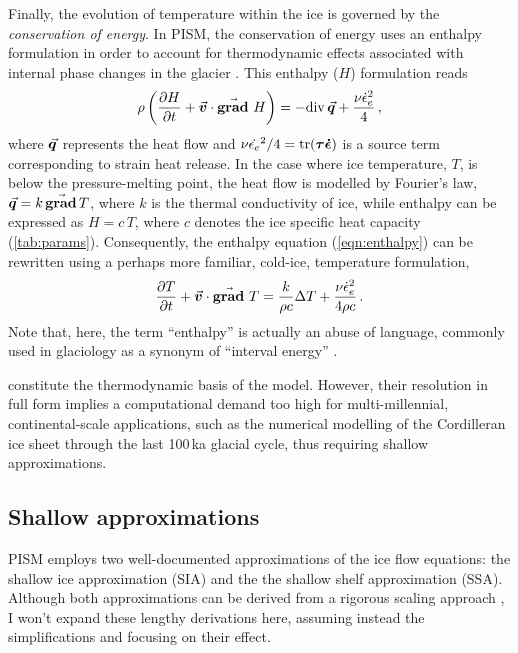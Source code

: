 \documentclass[a4paper]{kappa}
\newcommand{\vect}[1]{\va*{#1}} %
\newcommand{\tens}[1]{\vb*{#1}} %
\renewcommand{\div}[1]{\mathrm{div}\,#1}            %
\renewcommand{\grad}[1]{\vect{\mathrm{grad}}\,#1}   %
\newcommand{\matdv}[1]{\pdv{#1}{t}+\vect{v}\cdot\grad{}\,#1}  %
\newcommand{\doteps}[0]{\dot{\epsilon}} %
\newcommand{\DST}[0]{\tens{\tau}}       %
\newcommand{\SRT}[0]{\tens{\doteps}}    %
\begin{document}
Finally, the evolution of temperature within the ice is governed by the
\emph{conservation of energy}. In PISM, the conservation of energy uses an
enthalpy formulation in order to
account for thermodynamic effects associated with internal phase changes in the
glacier \citep[Eqs.~20--21]{Aschwanden.etal.2012}. This enthalpy ($H$)
formulation reads
\begin{equation}
    \label{eqn:enthalpy}
    \rho \left(\matdv{H}\right)
        = -\div{\vect{q}} + \frac{\nu\doteps_e^2}{4} \,,
\end{equation}
where $\vect{q}$ represents the heat flow and
${\nu\dot{\epsilon_e}^2/4 = \tr(\DST\SRT)}$ is a
source term corresponding to strain heat release. In the case where ice
temperature, $T$, is below the pressure-melting point, the heat flow is
modelled by Fourier's law, $\vect{q} = k\,\grad{T}$, where $k$ is the thermal
conductivity of ice, while enthalpy can be expressed as $H=c\,T$, where $c$
denotes the ice specific heat capacity (\cref{tab:params}).
Consequently, the enthalpy equation (\ref{eqn:enthalpy}) can be rewritten using
a perhaps more familiar, cold-ice, temperature formulation,
\begin{equation}
    \label{eqn:temperature}
    \matdv{T} = \frac{k}{\rho c} \Delta T
                + \frac{\nu\doteps_e^2}{4\rho c} \,.
\end{equation}
Note that, here, the term ``enthalpy'' is actually an abuse of
language, commonly used in glaciology as a synonym of ``interval energy''
\citep{Aschwanden.etal.2012}.

constitute the thermodynamic basis
of the model. However, their resolution in full form implies a computational
demand too high for multi-millennial, continental-scale applications, such as
the numerical modelling of the Cordilleran ice sheet through the last 100\,ka
glacial cycle, thus requiring shallow approximations.


\subsection{Shallow approximations}
\label{sec:siassa}

PISM employs two well-documented
approximations of the ice flow equations: the shallow ice approximation (SIA)
and the the shallow shelf approximation (SSA). Although both approximations can
be derived from a rigorous scaling approach
    \citep{Morland.Johnson.1980, Hutter.1983,
           Morland.1987, Weis.etal.1999},
I won't expand these lengthy derivations
here, assuming instead the simplifications and focusing on their effect.
\end{document}
